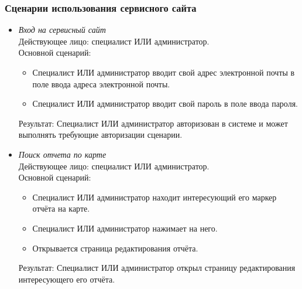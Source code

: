 \subsubsection{Сценарии использования сервисного сайта}

\begin{itemize}[topsep=0pt, parsep=0pt, itemsep=0pt, leftmargin=*, labelindent=0.5cm]
	\item \textit{Вход на сервисный сайт} \\
	Действующее лицо: специалист ИЛИ администратор. \\
	Основной сценарий:
	\begin{itemize}[topsep=0pt, parsep=0pt, itemsep=0pt, leftmargin=*, labelindent=0.5cm]
		\item Специалист ИЛИ администратор вводит свой адрес электронной почты в поле ввода адреса электронной почты.
		\item Специалист ИЛИ администратор вводит свой пароль в поле ввода пароля.
	\end{itemize}
	Результат: Специалист ИЛИ администратор авторизован в системе и может выполнять требующие авторизации сценарии.
\end{itemize}

\begin{itemize}[topsep=0pt, parsep=0pt, itemsep=0pt, leftmargin=*, labelindent=0.5cm]
	\item \textit{Поиск отчета по карте} \\
	Действующее лицо: специалист ИЛИ администратор. \\
	Основной сценарий:
	\begin{itemize}[topsep=0pt, parsep=0pt, itemsep=0pt, leftmargin=*, labelindent=0.5cm]
		\item Специалист ИЛИ администратор находит интересующий его маркер отчёта на карте.
		\item Специалист ИЛИ администратор нажимает на него.
		\item Открывается страница редактирования отчёта.
	\end{itemize}
	Результат: Специалист ИЛИ администратор открыл страницу редактирования интересующего его отчёта.
\end{itemize}

